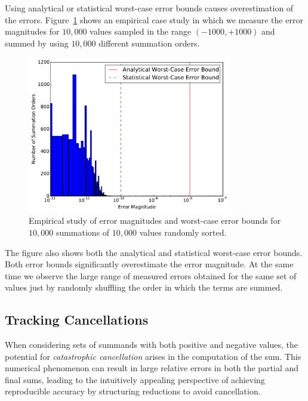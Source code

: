 Using analytical or statistical worst-case error bounds causes
overestimation of the errors. Figure~\ref{fig:errorbounds} shows an
empirical case study in which we measure the error magnitudes for
$10,000$ values sampled in the range $(-1000, +1000)$ and summed by
using $10,000$ different summation orders.
\begin{figure}[!htb]
  \centering
  \includegraphics[width=0.80\textwidth]{chapter_2_figures/error_variability_histogram.pdf}
  \caption{Empirical study of error magnitudes and worst-case error
    bounds for $10,000$ summations of $10,000$ values randomly
    sorted.}
  \label{fig:errorbounds}
\end{figure}
The figure also shows both the analytical and statistical worst-case
error bounds. Both error bounds significantly overestimate the error
magnitude. At the same time we observe the large range of measured
errors obtained for the same set of values just by randomly shuffling
the order in which the terms are summed.

\subsection{Tracking Cancellations}

When considering sets of summands with both positive and negative
values, the potential for \emph{catastrophic cancellation} arises in
the computation of the sum. This numerical phenomenon can result in
large relative errors in both the partial and final sums, leading to
the intuitively appealing perspective of achieving reproducible
accuracy by structuring reductions to avoid cancellation.

